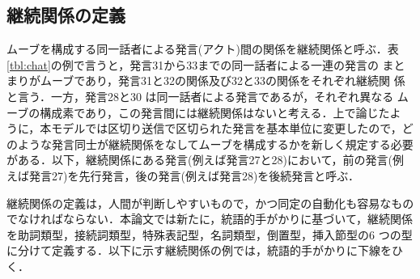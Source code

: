 \subsection{継続関係の定義}

ムーブを構成する同一話者による発言(アクト)間の関係を継続関係と呼ぶ．表
\ref{tbl:chat}の例で言うと，発言31から33までの同一話者による一連の発言の
まとまりがムーブであり，発言31と32の関係及び32と33の関係をそれぞれ継続関
係と言う．一方，発言28と30 は同一話者による発言であるが，それぞれ異なる
ムーブの構成素であり，この発言間には継続関係はないと考える．上で論じたよ
うに，本モデルでは区切り送信で区切られた発言を基本単位に変更したので，ど
のような発言同士が継続関係をなしてムーブを構成するかを新しく規定する必要
がある．以下，継続関係にある発言(例えば発言27と28)において，前の発言(例
えば発言27)を先行発言，後の発言(例えば発言28)を後続発言と呼ぶ．

継続関係の定義は，人間が判断しやすいもので，かつ同定の自動化も容易なもの
でなければならない．本論文では新たに，統語的手がかりに基づいて，継続関係
を助詞類型，接続詞類型，特殊表記型，名詞類型，倒置型，挿入節型の6 つの型
に分けて定義する．以下に示す継続関係の例では，統語的手がかりに下線をひく．

